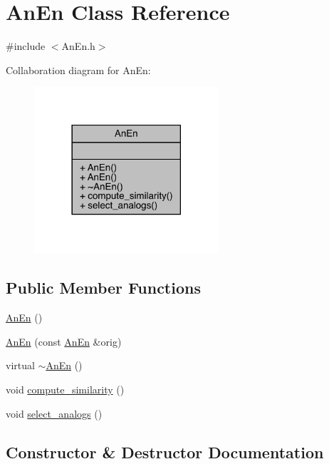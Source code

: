 \hypertarget{class_an_en}{}\section{An\+En Class Reference}
\label{class_an_en}


{\ttfamily \#include $<$An\+En.\+h$>$}



Collaboration diagram for An\+En\+:
\nopagebreak
\begin{figure}[H]
\begin{center}
\leavevmode
\includegraphics[width=194pt]{class_an_en__coll__graph}
\end{center}
\end{figure}
\subsection*{Public Member Functions}
\begin{DoxyCompactItemize}
\item 
\mbox{\hyperlink{class_an_en_a60c12de232af95794a6194fbac06623a}{An\+En}} ()
\item 
\mbox{\hyperlink{class_an_en_a7fed6ed88ade22211fd75028a3a9491e}{An\+En}} (const \mbox{\hyperlink{class_an_en}{An\+En}} \&orig)
\item 
virtual \mbox{\hyperlink{class_an_en_a18609907411058ee2c343727ab69bff4}{$\sim$\+An\+En}} ()
\item 
void \mbox{\hyperlink{class_an_en_a474249893701af8b457633fe7df8984b}{compute\+\_\+similarity}} ()
\item 
void \mbox{\hyperlink{class_an_en_a179079dda478bf08e1a2937e9e17e51c}{select\+\_\+analogs}} ()
\end{DoxyCompactItemize}


\subsection{Constructor \& Destructor Documentation}
\mbox{\label{class_an_en_a60c12de232af95794a6194fbac06623a}} 
